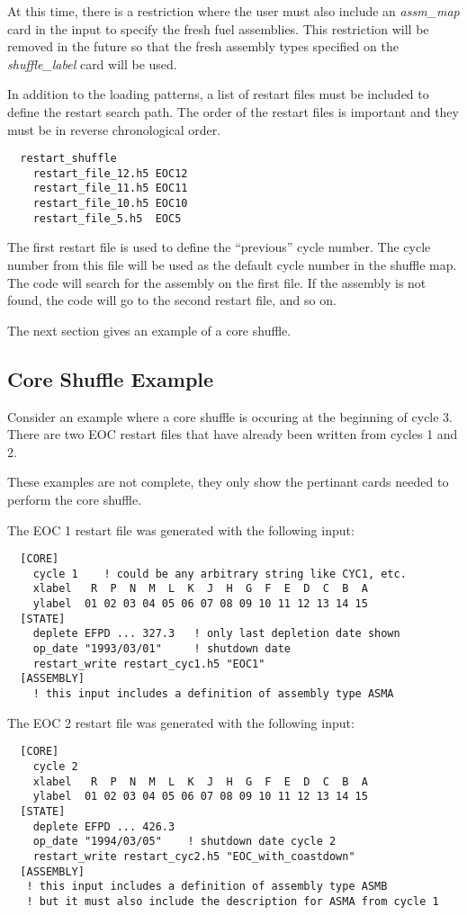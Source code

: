 At this time, there is a restriction where the user must also include an {\it assm\_map} card
in the input to specify the fresh fuel assemblies.  This restriction will be removed in the
future so that the fresh assembly types specified on the {\it shuffle\_label} card will be used.

In addition to the loading patterns, a list of restart files must be included to
define the restart search path.  The order of the restart files is important and they
must be in reverse chronological order.
\begin{verbatim}
  restart_shuffle
    restart_file_12.h5 EOC12
    restart_file_11.h5 EOC11
    restart_file_10.h5 EOC10
    restart_file_5.h5  EOC5
\end{verbatim}
The first restart file is used to define the ``previous'' cycle number.  The cycle number
from this file will be used as the default cycle number in the shuffle map.
The code will search for the assembly on the first file. If the assembly is not found,
the code will go to the second restart file, and so on.

The next section gives an example of a core shuffle.

\subsection{Core Shuffle Example}

Consider an example where a core shuffle is occuring at the beginning of cycle 3.
There are two EOC restart files that have already been written from cycles 1 and 2.

These examples are not complete, they only show the pertinant cards needed
to perform the core shuffle.

The EOC 1 restart file was generated with the following input:
\begin{verbatim}
  [CORE]
    cycle 1    ! could be any arbitrary string like CYC1, etc.
    xlabel   R  P  N  M  L  K  J  H  G  F  E  D  C  B  A
    ylabel  01 02 03 04 05 06 07 08 09 10 11 12 13 14 15
  [STATE]
    deplete EFPD ... 327.3   ! only last depletion date shown
    op_date "1993/03/01"     ! shutdown date
    restart_write restart_cyc1.h5 "EOC1"
  [ASSEMBLY]
    ! this input includes a definition of assembly type ASMA
\end{verbatim}

The EOC 2 restart file was generated with the following input:
\begin{verbatim}
  [CORE]
    cycle 2
    xlabel   R  P  N  M  L  K  J  H  G  F  E  D  C  B  A
    ylabel  01 02 03 04 05 06 07 08 09 10 11 12 13 14 15
  [STATE]
    deplete EFPD ... 426.3
    op_date "1994/03/05"    ! shutdown date cycle 2
    restart_write restart_cyc2.h5 "EOC_with_coastdown"
  [ASSEMBLY]
   ! this input includes a definition of assembly type ASMB
   ! but it must also include the description for ASMA from cycle 1
\end{verbatim}

